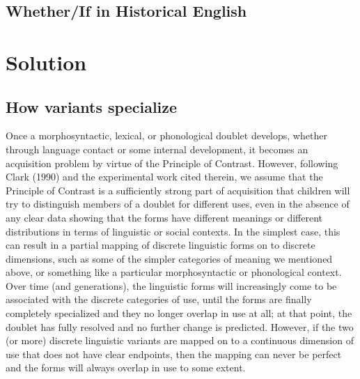 
\subsection{Whether/If in Historical English}

\section{Solution}
\label{solution}
 \subsection{How variants specialize}
Once a morphosyntactic, lexical, or phonological doublet develops, whether through language contact or some internal development, it becomes an acquisition problem by virtue of the Principle of Contrast. 
However, following Clark (1990) and the experimental work cited therein, we assume that the Principle of Contrast is a sufficiently strong part of acquisition that children will try to distinguish members of a doublet for different uses, even in the absence of any clear data showing that the forms have different meanings or different distributions in terms of linguistic or social contexts. 
In the simplest case, this can result in a partial mapping of discrete linguistic forms on to discrete dimensions, such as some of the simpler categories of meaning we mentioned above, or something like a particular morphosyntactic or phonological context. 
Over time (and generations), the linguistic forms will increasingly come to be associated with the discrete categories of use, until the forms are finally completely specialized and they no longer overlap in use at all; at that point, the doublet has fully resolved and no further change is predicted.
However, if the two (or more) discrete linguistic variants are mapped on to a continuous dimension of use that does not have clear endpoints, then the mapping can never be perfect and the forms will always overlap in use to some extent.


